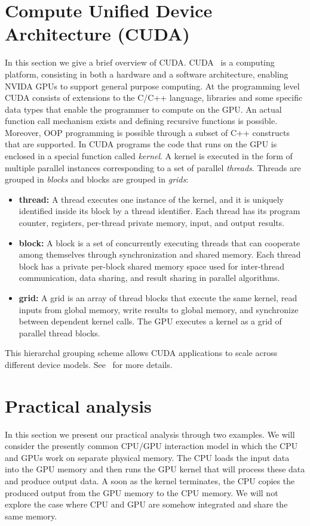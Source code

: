 \documentclass[11pt]{llncs}
\begin{document}
\section{Compute Unified Device Architecture (CUDA)}
\label{sec:CUDA}
In this section we give a brief overview of CUDA.
CUDA~\cite{CUDAProgramming2014} is a computing platform, consisting in both a hardware and a software architecture, enabling NVIDA GPUs to support general purpose computing. 
At the programming level CUDA consists of extensions to the C/C++ language, libraries and some specific data types that enable the programmer to compute on the GPU.
An actual function call mechanism exists and defining recursive functions is possible. Moreover, OOP programming is possible through a subset of C++ constructs that are supported. 
In CUDA programs the code that runs on the GPU is enclosed in a special function called \textit{kernel}. 
A kernel is executed in the form of multiple parallel instances corresponding to a set of parallel \textit{threads}. 
Threads are grouped in \textit{blocks} and blocks are grouped in \textit{grids}:
\begin{itemize}
\item \textbf{thread:} A thread executes one instance of the kernel, and it is uniquely identified inside its block by a thread identifier. 
Each thread has its program counter, registers, per-thread private memory, input, and output results. 
\item \textbf{block:} A block is a set of concurrently executing threads that can cooperate among themselves through synchronization and shared memory.
Each thread block has a private per-block shared memory space used for inter-thread communication, data sharing, and result sharing in parallel algorithms.
\item \textbf{grid:} A grid is an array of thread blocks that execute the same kernel, read inputs from global memory, write results to global memory, and synchronize between dependent kernel calls.
The GPU executes a kernel as a grid of parallel thread blocks.
\end{itemize}
This hierarchal grouping scheme allows CUDA applications to scale across different device models.
See~\cite{CUDAProgramming2014} for more details.

\section{Practical analysis}
In this section we present our practical analysis through two examples.
We will consider the presently common CPU/GPU interaction model in which the CPU and GPUs work on separate physical memory.
The CPU loads the input data into the GPU memory and then runs the GPU kernel that will process these data and produce output data.
A soon as the kernel terminates, the CPU copies the produced output from the GPU memory to the CPU memory.
We will not explore the case where CPU and GPU are somehow integrated and share the same memory.
\end{document}
